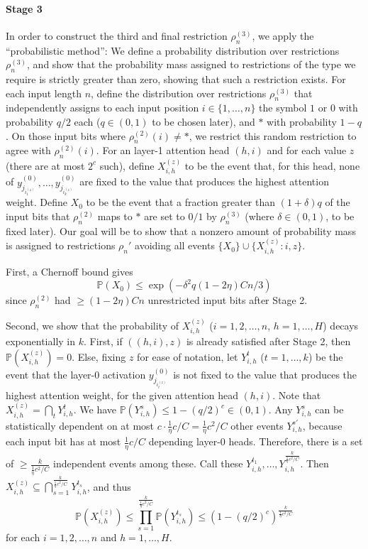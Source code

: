 \documentclass[11pt,a4paper]{article}
\newcommand{\Prob}{\mathbb{P}}%
\begin{document}
\paragraph{Stage 3}
In order to construct the third and final restriction $\rho^{(3)}_n$, we apply the ``probabilistic method'': We define a probability distribution over restrictions $\rho^{(3)}_n$, and show that the probability mass assigned to restrictions of the type we require is strictly greater than zero, showing that such a restriction exists.
For each input length $n$, define the distribution over restrictions $\rho_n^{(3)}$ that independently assigns to each input position $i \in \{1, \dots, n\}$ the symbol $1$ or $0$ with probability $q/2$ each ($q \in (0,1)$ to be chosen later), and $*$ with probability $1-q$.
On those input bits where $\rho_n^{(2)}(i) \neq *$, we restrict this random restriction to agree with $\rho_n^{(2)}(i)$.
For an layer-1 attention head $(h,i)$ and for each value $z$ (there are at most $2^c$ such), define $X_{i,h}^{(z)}$ to be the event that, for this head, none of $y_{j_{i_1^{(z)}}}^{(0)}, \dots, y_{j_{i_k^{(z)}}}^{(0)}$ are fixed to the value that produces the highest attention weight.
Define $X_0$ to be the event that a fraction greater than $(1+\delta)q$ of the input bits that $\rho_n^{(2)}$ maps to $*$ are set to $0/1$ by $\rho_n^{(3)}$ (where $\delta \in (0,1)$, to be fixed later).
Our goal will be to show that a nonzero amount of probability mass is assigned to restrictions $\rho_n'$ avoiding all events $\{X_0\} \cup \{X_{i,h}^{(z)} : i, z\}$.

First, a Chernoff bound gives~\cite[Theorem 4.4]{mitzenmacherprobability}
\begin{equation}
\Prob(X_0) \leq    \exp\left(-\delta^2q(1-2\eta)Cn / 3\right)
\end{equation}
since $\rho_n^{(2)}$ had $\geq (1-2\eta)Cn$ unrestricted input bits after Stage 2.

Second, we show that the probability of $X_{i,h}^{(z)}$ ($i=1,2,\dots, n$, $h=1, \dots, H$) decays exponentially in $k$.
First, if $((h,i),z)$ is already satisfied after Stage 2, then $\Prob(X_{i,h}^{(z)}) = 0$.
Else, fixing $z$ for ease of notation, let $Y_{i,h}^t$ ($t=1,\dots,k$) be the event that the layer-0 activation $y_{j_{i_t^{(z)}}}^{(0)}$ is not fixed to the value that produces the highest attention weight, for the given attention head $(h,i)$.
Note that $X_{i,h}^{(z)} = \bigcap_t Y_{i,h}^t$.
We have $\Prob(Y_{i,h}^s) \leq 1-(q/2)^c \in (0,1)$. 
Any $Y_{i,h}^s$ can be statistically dependent on at most $c \cdot \frac{1}{\eta}c/C = \frac{1}{\eta}c^2/C$ other events $Y_{i,h}^{s'}$, because each input bit has at most $\frac{1}{\eta} c/C$ depending layer-0 heads.
Therefore, there is a set of $\geq \frac{k}{\frac{1}{\eta}c^2/C}$ independent events among these.
Call these $Y_{i,h}^{t_1}, \dots, Y_{i,h}^{\frac{k}{\frac{1}{\eta}c^2/C}}$.
Then $X_{i,h}^{(z)} \subseteq \bigcap_{s=1}^{\frac{k}{\frac{1}{\eta}c^2/C}} Y_{i,h}^{t_s}$, and thus
\begin{equation}
\Prob(X_{i,h}^{(z)}) \leq \prod_{s=1}^{\frac{k}{\frac{1}{\eta}c^2/C}} \Prob(Y_{i,h}^{t_s}) \leq \left(1-(q/2)^c\right)^{\frac{k}{\frac{1}{\eta}c^2/C}}
\end{equation}
for each $i=1,2,\dots, n$ and $h=1, \dots, H$.
\end{document}
